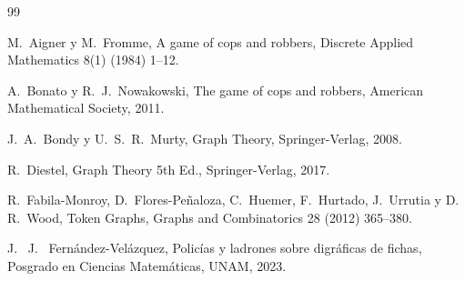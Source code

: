\begin{thebibliography}{99}

  M.~Aigner y M.~Fromme,
  A game of cops and robbers,
  Discrete Applied Mathematics 8(1) (1984) 1--12.

  A.~Bonato y R.~J.~Nowakowski,
  The game of cops and robbers,
  American Mathematical Society, 2011.

  J.~A.~Bondy y U.~S.~R.~Murty,
  Graph Theory,
  Springer-Verlag, 2008.

  R.~Diestel,
  Graph Theory 5th Ed.,
  Springer-Verlag, 2017.

  R.~Fabila-Monroy, D.~Flores-Pe\~naloza, C.~Huemer, F.~Hurtado, J.~Urrutia y D.~
  R.~Wood,
  Token Graphs,
  Graphs and Combinatorics 28 (2012) 365--380.

  J.~ J.~ Fern\'andez-Vel\'azquez, Polic\'ias y ladrones sobre digr\'aficas de fichas,
  Posgrado en Ciencias Matem\'aticas, UNAM, 2023.

\end{thebibliography}
